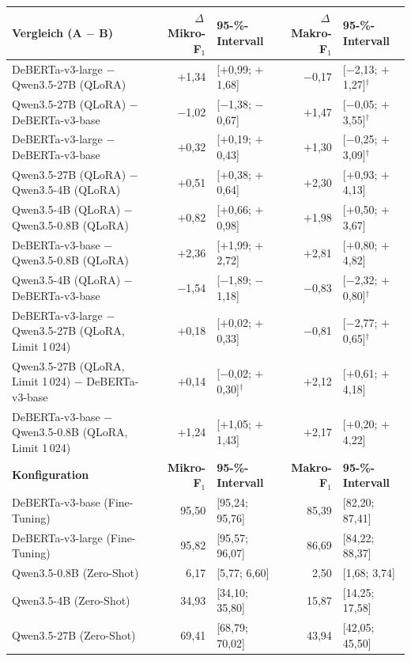 \begin{tabular}{lrlrl}
    \toprule
    \textbf{Vergleich (A $-$ B)} & $\Delta$\,\textbf{Mikro-F$_1$} & \textbf{95-\%-Intervall} &
      $\Delta$\,\textbf{Makro-F$_1$} & \textbf{95-\%-Intervall} \\
    \midrule
    DeBERTa-v3-large $-$ Qwen3.5-27B (QLoRA) & $+$1,34 & [$+$0,99; $+$1,68] & $-$0,17 & [$-$2,13; $+$1,27]$^{\dagger}$ \\
    Qwen3.5-27B (QLoRA) $-$ DeBERTa-v3-base & $-$1,02 & [$-$1,38; $-$0,67] & $+$1,47 & [$-$0,05; $+$3,55]$^{\dagger}$ \\
    DeBERTa-v3-large $-$ DeBERTa-v3-base & $+$0,32 & [$+$0,19; $+$0,43] & $+$1,30 & [$-$0,25; $+$3,09]$^{\dagger}$ \\
    Qwen3.5-27B (QLoRA) $-$ Qwen3.5-4B (QLoRA) & $+$0,51 & [$+$0,38; $+$0,64] & $+$2,30 & [$+$0,93; $+$4,13] \\
    Qwen3.5-4B (QLoRA) $-$ Qwen3.5-0.8B (QLoRA) & $+$0,82 & [$+$0,66; $+$0,98] & $+$1,98 & [$+$0,50; $+$3,67] \\
    DeBERTa-v3-base $-$ Qwen3.5-0.8B (QLoRA) & $+$2,36 & [$+$1,99; $+$2,72] & $+$2,81 & [$+$0,80; $+$4,82] \\
    Qwen3.5-4B (QLoRA) $-$ DeBERTa-v3-base & $-$1,54 & [$-$1,89; $-$1,18] & $-$0,83 & [$-$2,32; $+$0,80]$^{\dagger}$ \\
    DeBERTa-v3-large $-$ Qwen3.5-27B (QLoRA, Limit 1\,024) & $+$0,18 & [$+$0,02; $+$0,33] & $-$0,81 & [$-$2,77; $+$0,65]$^{\dagger}$ \\
    Qwen3.5-27B (QLoRA, Limit 1\,024) $-$ DeBERTa-v3-base & $+$0,14 & [$-$0,02; $+$0,30]$^{\dagger}$ & $+$2,12 & [$+$0,61; $+$4,18] \\
    DeBERTa-v3-base $-$ Qwen3.5-0.8B (QLoRA, Limit 1\,024) & $+$1,24 & [$+$1,05; $+$1,43] & $+$2,17 & [$+$0,20; $+$4,22] \\
    \midrule
    \textbf{Konfiguration} & \textbf{Mikro-F$_1$} & \textbf{95-\%-Intervall} &
      \textbf{Makro-F$_1$} & \textbf{95-\%-Intervall} \\
    \midrule
    DeBERTa-v3-base (Fine-Tuning) & 95,50 & [95,24; 95,76] & 85,39 & [82,20; 87,41] \\
    DeBERTa-v3-large (Fine-Tuning) & 95,82 & [95,57; 96,07] & 86,69 & [84,22; 88,37] \\
    Qwen3.5-0.8B (Zero-Shot) & 6,17 & [5,77; 6,60] & 2,50 & [1,68; 3,74] \\
    Qwen3.5-4B (Zero-Shot) & 34,93 & [34,10; 35,80] & 15,87 & [14,25; 17,58] \\
    Qwen3.5-27B (Zero-Shot) & 69,41 & [68,79; 70,02] & 43,94 & [42,05; 45,50] \\

\end{tabular}

